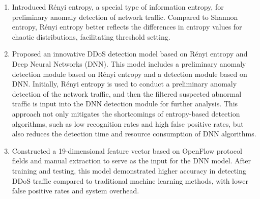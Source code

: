 \begin{abstract*}
 \begin{enumerate}
     \item Introduced Rényi entropy, a special type of information entropy, for preliminary anomaly detection of network traffic. Compared to Shannon entropy, Rényi entropy better reflects the differences in entropy values for chaotic distributions, facilitating threshold setting.
     \item Proposed an innovative DDoS detection model based on Rényi entropy and Deep Neural Networks (DNN). This model includes a preliminary anomaly detection module based on Rényi entropy and a detection module based on DNN. Initially, Rényi entropy is used to conduct a preliminary anomaly detection of the network traffic, and then the filtered suspected abnormal traffic is input into the DNN detection module for further analysis. This approach not only mitigates the shortcomings of entropy-based detection algorithms, such as low recognition rates and high false positive rates, but also reduces the detection time and resource consumption of DNN algorithms.
     \item Constructed a 19-dimensional feature vector based on OpenFlow protocol fields and manual extraction to serve as the input for the DNN model. After training and testing, this model demonstrated higher accuracy in detecting DDoS traffic compared to traditional machine learning methods, with lower false positive rates and system overhead.
 \end{enumerate}

  \end{abstract*}
